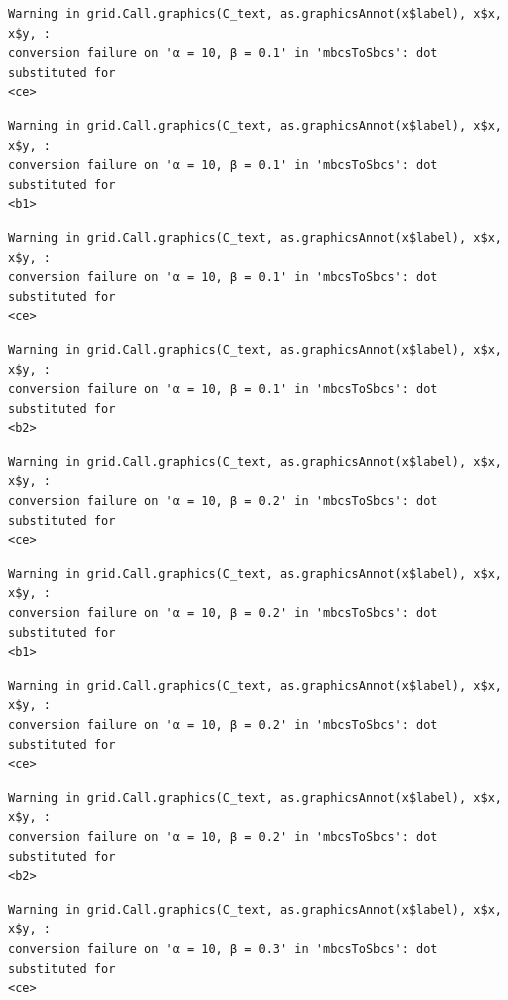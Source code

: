 \documentclass[
  spanish,
  a4paper,
]{scrreport}
\theoremstyle{plain}
\theoremstyle{definition}
\theoremstyle{definition}
\theoremstyle{remark}
\begin{document}
\begin{verbatim}
Warning in grid.Call.graphics(C_text, as.graphicsAnnot(x$label), x$x, x$y, :
conversion failure on 'α = 10, β = 0.1' in 'mbcsToSbcs': dot substituted for
<ce>
\end{verbatim}

\begin{verbatim}
Warning in grid.Call.graphics(C_text, as.graphicsAnnot(x$label), x$x, x$y, :
conversion failure on 'α = 10, β = 0.1' in 'mbcsToSbcs': dot substituted for
<b1>
\end{verbatim}

\begin{verbatim}
Warning in grid.Call.graphics(C_text, as.graphicsAnnot(x$label), x$x, x$y, :
conversion failure on 'α = 10, β = 0.1' in 'mbcsToSbcs': dot substituted for
<ce>
\end{verbatim}

\begin{verbatim}
Warning in grid.Call.graphics(C_text, as.graphicsAnnot(x$label), x$x, x$y, :
conversion failure on 'α = 10, β = 0.1' in 'mbcsToSbcs': dot substituted for
<b2>
\end{verbatim}

\begin{verbatim}
Warning in grid.Call.graphics(C_text, as.graphicsAnnot(x$label), x$x, x$y, :
conversion failure on 'α = 10, β = 0.2' in 'mbcsToSbcs': dot substituted for
<ce>
\end{verbatim}

\begin{verbatim}
Warning in grid.Call.graphics(C_text, as.graphicsAnnot(x$label), x$x, x$y, :
conversion failure on 'α = 10, β = 0.2' in 'mbcsToSbcs': dot substituted for
<b1>
\end{verbatim}

\begin{verbatim}
Warning in grid.Call.graphics(C_text, as.graphicsAnnot(x$label), x$x, x$y, :
conversion failure on 'α = 10, β = 0.2' in 'mbcsToSbcs': dot substituted for
<ce>
\end{verbatim}

\begin{verbatim}
Warning in grid.Call.graphics(C_text, as.graphicsAnnot(x$label), x$x, x$y, :
conversion failure on 'α = 10, β = 0.2' in 'mbcsToSbcs': dot substituted for
<b2>
\end{verbatim}

\begin{verbatim}
Warning in grid.Call.graphics(C_text, as.graphicsAnnot(x$label), x$x, x$y, :
conversion failure on 'α = 10, β = 0.3' in 'mbcsToSbcs': dot substituted for
<ce>
\end{verbatim}
\end{document}
